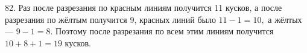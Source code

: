 82. Раз после разрезания по красным линиям получится 11 кусков, а после разрезания по жёлтым получится 9, красных линий было $11-1=10,$ а жёлтых --- $9-1=8.$ Поэтому после разрезания по всем этим линиям получится $10+8+1=19$ кусков.\\
